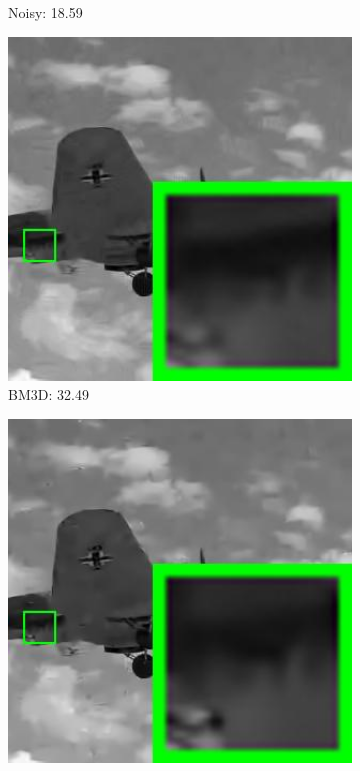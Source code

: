 \begin{figure}
\begin{subfigure}[t]{0.24\textwidth}
		\caption{Noisy: 18.59}
    \end{subfigure}
    \hfill
    \begin{subfigure}[t]{0.24\textwidth}
        \centering
        \includegraphics[width=1\textwidth]{images/pgpd/200img/br_BM3D_30_3063.jpg}
		\caption{BM3D: 32.49}
    \end{subfigure}
    \hfill
    \begin{subfigure}[t]{0.24\textwidth}
        \centering
        \includegraphics[width=1\textwidth]{images/pgpd/200img/br_EPLL_30_3063.jpg}

\end{subfigure}
\end{figure}
